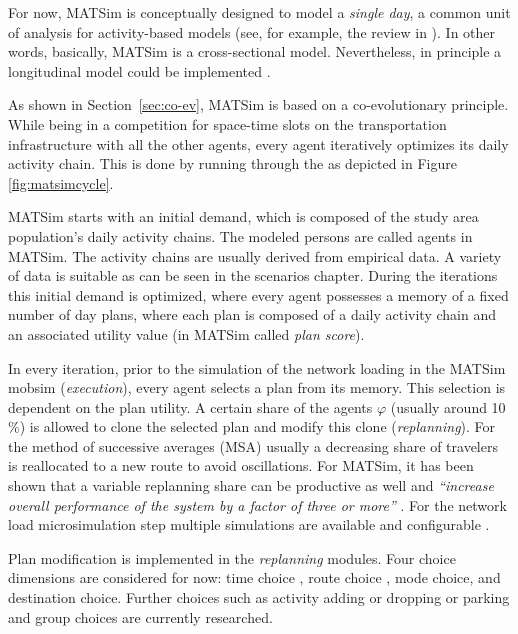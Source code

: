For now, MATSim is conceptually designed to model a \emph{single day}, a common unit of analysis for activity-based models (see, for example, the review in \citet[][]{Bowman_TEC_2009_1}). In other words, basically, MATSim is a cross-sectional model. Nevertheless, in principle a longitudinal model could be implemented \citep[][]{HorniEtAl_TechRep_IVT_2012_a}.

As shown in Section~\ref{sec:co-ev}, MATSim is based on a co-evolutionary principle. While being in a competition for space-time slots on the transportation infrastructure with all the other agents, every agent iteratively optimizes its daily activity chain. This is done by running through the  as depicted in Figure \ref{fig:matsimcycle}. 

MATSim starts with an initial demand, which is composed of the study area population's daily activity chains. The modeled persons are called agents in MATSim. The activity chains are usually derived from empirical data. A variety of data is suitable as can be seen in the scenarios chapter. During the iterations this initial demand is optimized, where every agent possesses a memory of a fixed number of day plans, where each plan is composed of a daily activity chain and an associated utility value (in MATSim called \emph{plan score}).

In every iteration, prior to the simulation of the network loading in the MATSim \gls{mobsim} \citep[e.g.,][]{Cetin_PhDThesis_2005} (\emph{execution}), every agent selects a plan from its memory. This selection is dependent on the plan utility. A certain share of the agents $\varphi$ (usually around 10$\%$) is allowed to clone the selected plan and modify this clone (\emph{replanning}). For the method of successive averages (MSA) usually a decreasing share of travelers is reallocated to a new route to avoid oscillations. For MATSim, it has been shown that a variable replanning share can be productive as well and \emph{``increase overall performance of the system by a factor of three or more''} \citep[][p.7f]{CharyparEtAl_IATBR_2006}. For the network load microsimulation step multiple simulations are available and configurable \citep[][p.10f]{HorniEtAl_TechRep_IVT_2011_a}. 

Plan modification is implemented in the \emph{replanning} modules. Four choice dimensions are considered for now: time choice \citep[][]{BalmerEtAl_Timmermans_2005}, route choice \citep[]{LefebvreBalmer_STRC_2007}, mode choice, and destination choice. Further choices such as activity adding or dropping or parking and group choices are currently researched. %

